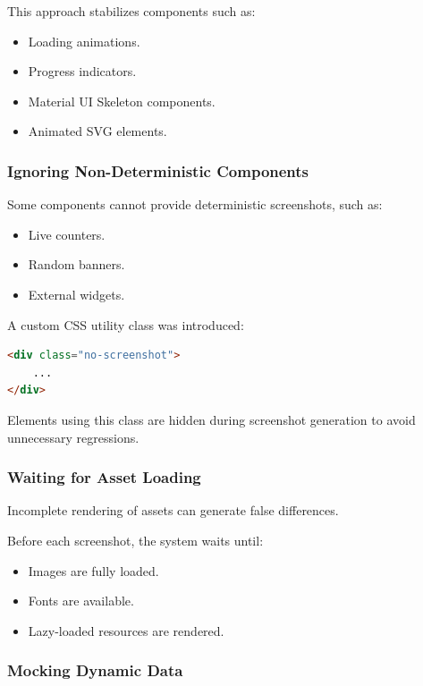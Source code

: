 This approach stabilizes components such as:

\begin{itemize}
    \item Loading animations.
    \item Progress indicators.
    \item Material UI Skeleton components.
    \item Animated SVG elements.
\end{itemize}


\subsubsection{Ignoring Non-Deterministic Components}

Some components cannot provide deterministic screenshots, such as:

\begin{itemize}
    \item Live counters.
    \item Random banners.
    \item External widgets.
\end{itemize}

A custom CSS utility class was introduced:

\begin{lstlisting}[language=HTML]
<div class="no-screenshot">
    ...
</div>
\end{lstlisting}

Elements using this class are hidden during screenshot generation to avoid unnecessary regressions.


\subsubsection{Waiting for Asset Loading}

Incomplete rendering of assets can generate false differences.

Before each screenshot, the system waits until:

\begin{itemize}
    \item Images are fully loaded.
    \item Fonts are available.
    \item Lazy-loaded resources are rendered.
\end{itemize}


\subsubsection{Mocking Dynamic Data}

